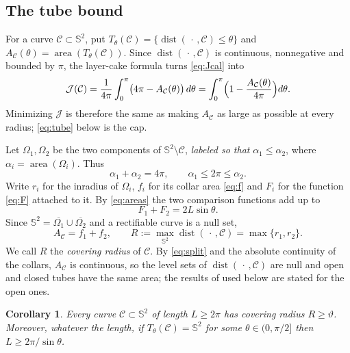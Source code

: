 \documentclass[11pt,oneside,reqno]{amsart}
\theoremstyle{plain}
\newtheorem{corollary}[theorem]{Corollary}
\theoremstyle{definition}
\DeclareMathOperator{\dist}{dist}
\DeclareMathOperator{\area}{area}
\newcommand{\Sph}{\mathbb{S}^{2}}
\begin{document}
\subsection{The tube bound}\label{ssec:tube}

For a curve $\mathcal{C}\subset\Sph$, put
$T_{\theta}(\mathcal{C})=\{\dist(\,\cdot\,,\mathcal{C})\le\theta\}$ and
$A_{\mathcal{C}}(\theta)=\area(T_{\theta}(\mathcal{C}))$. Since
$\dist(\,\cdot\,,\mathcal{C})$ is continuous,
nonnegative and bounded by $\pi$, the layer-cake formula turns \eqref{eq:Jcal} into
\begin{equation}\label{eq:layercake}
  \mathcal{J}(\mathcal{C})=\frac{1}{4\pi}\int_{0}^{\pi}\bigl(4\pi-A_{\mathcal{C}}(\theta)\bigr)\,d\theta
      =\int_{0}^{\pi}\Bigl(1-\frac{A_{\mathcal{C}}(\theta)}{4\pi}\Bigr)d\theta .
\end{equation}
Minimizing $\mathcal{J}$ is therefore the same as making $A_{\mathcal{C}}$ as
large as possible at every radius; \eqref{eq:tube} below is the cap.

Let
$\Omega_{1},\Omega_{2}$ be the two components of $\Sph\setminus\mathcal{C}$,
\emph{labeled so that} $\alpha_{1}\le\alpha_{2}$, where
$\alpha_{i}=\area(\Omega_{i})$. Thus
\begin{equation}\label{eq:areas}
  \alpha_{1}+\alpha_{2}=4\pi,\qquad \alpha_{1}\le2\pi\le\alpha_{2} .
\end{equation}
Write $r_{i}$ for the inradius of $\Omega_{i}$, $f_{i}$ for its collar area
\eqref{eq:f} and $F_{i}$ for the function \eqref{eq:F} attached to it. By
\eqref{eq:areas} the two comparison functions add up to
\begin{equation}\label{eq:Fsum}
  F_{1}+F_{2}=2L\sin\theta .
\end{equation}
Since
$\Sph=\overline{\Omega_{1}}\cup\overline{\Omega_{2}}$ and a rectifiable curve is
a null set,
\begin{equation}\label{eq:split}
  A_{\mathcal{C}}=f_{1}+f_{2},
  \qquad
  R:=\max_{\Sph}\dist(\,\cdot\,,\mathcal{C})=\max\{r_{1},r_{2}\} .
\end{equation}
We call $R$ the \emph{covering radius} of $\mathcal{C}$. By \eqref{eq:split} and
the absolute continuity of the collars, $A_{\mathcal{C}}$ is continuous, so the
level sets of $\dist(\,\cdot\,,\mathcal{C})$ are null and open and closed tubes
have the same area; the results of \cite{GvdM2011b} used below are stated for
the open ones.

\begin{corollary}\label{cor:cover}
Every curve $\mathcal{C}\subset\Sph$ of length $L\ge2\pi$ has covering radius
$R\ge\vartheta$. Moreover, whatever the length, if $T_{\theta}(\mathcal{C})=\Sph$
for some $\theta\in(0,\pi/2]$ then $L\ge2\pi/\sin\theta$.
\end{corollary}
\end{document}
